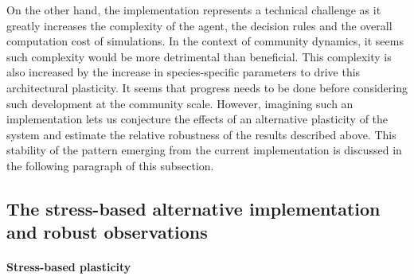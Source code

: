 On the other hand, the implementation represents a technical challenge as it greatly increases the complexity of the agent, the decision rules and the overall computation cost of simulations. In the context of community dynamics, it seems such complexity would be more detrimental than beneficial. This complexity is also increased by the increase in species-specific parameters to drive this architectural plasticity. It seems that progress needs to be done before considering such development at the community scale. However, imagining such an implementation lets us conjecture the effects of an alternative plasticity of the system and estimate the relative robustness of the results described above. This stability of the pattern emerging from the current implementation is discussed in the following paragraph of this subsection.




%
%
%
%
%
%
%
%
%


\subsection{The stress-based alternative implementation and robust observations}

\paragraph{Stress-based plasticity}

